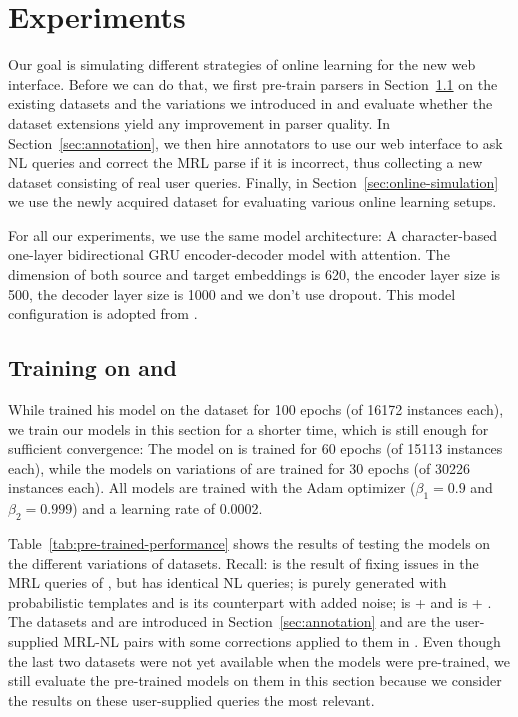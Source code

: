 \chapter{Experiments}
\label{ch:experiments}

Our goal is simulating different strategies of online learning for the new web
interface. Before we can do that, we first pre-train parsers in
Section~\ref{sec:pre-training} on the existing datasets \nlmapstwo{} and the
variations we introduced in \nlmapsthree{} and evaluate whether the dataset
extensions yield any improvement in parser quality. In
Section~\ref{sec:annotation}, we then hire annotators to use our web interface
to ask NL queries and correct the MRL parse if it is incorrect, thus collecting
a new dataset consisting of real user queries. Finally, in
Section~\ref{sec:online-simulation} we use the newly acquired dataset for
evaluating various online learning setups.

For all our experiments, we use the same model architecture: A character-based
one-layer bidirectional GRU encoder-decoder \parencite{cho-2014} model with
attention\parencite{bahdanau-2015}. The dimension of both source and target
embeddings is \num{620}, the encoder layer size is \num{500}, the decoder layer
size is \num{1000} and we don’t use dropout. This model configuration is adopted
from \textcite{staniek-2020}.

\section{Training on \nlmapstwo{} and \nlmapsthree{}}
\label{sec:pre-training}

While \textcite{staniek-2020} trained his model on the \nlmapstwo{} dataset for
\num{100} epochs (of \num{16172} instances each), we train our models in this
section for a shorter time, which is still enough for sufficient convergence:
The model on \nlmapstwoone{} is trained for \num{60} epochs (of \num{15113}
instances each), while the models on variations of \nlmapsthree{} are trained
for \num{30} epochs (of \num{30226} instances each). All models are trained with
the Adam optimizer (\(\beta_1 = 0.9\) and \(\beta_2 = 0.999\)) and a learning
rate of \num{0.0002}.

Table~\ref{tab:pre-trained-performance} shows the results of testing the models
on the different variations of \nlmaps{} datasets. Recall: \nlmtwoone{} is the
result of fixing issues in the MRL queries of \nlmtwo{}, but has identical NL
queries; \nlmthreea{} is purely generated with probabilistic templates and
\nlmthreeb{} is its counterpart with added noise; \nlmthreenormal{} is
\nlmtwoone{} + \nlmthreea{} and \nlmthree{} is \nlmtwoone{} + \nlmthreeb{}. The
datasets \nlmfourraw{} and \nlmfour{} are introduced in
Section~\ref{sec:annotation} and are the user-supplied MRL-NL pairs with some
corrections applied to them in \nlmfour{}. Even though the last two datasets
were not yet available when the models were pre-trained, we still evaluate the
pre-trained models on them in this section because we consider the results on
these user-supplied queries the most relevant.

